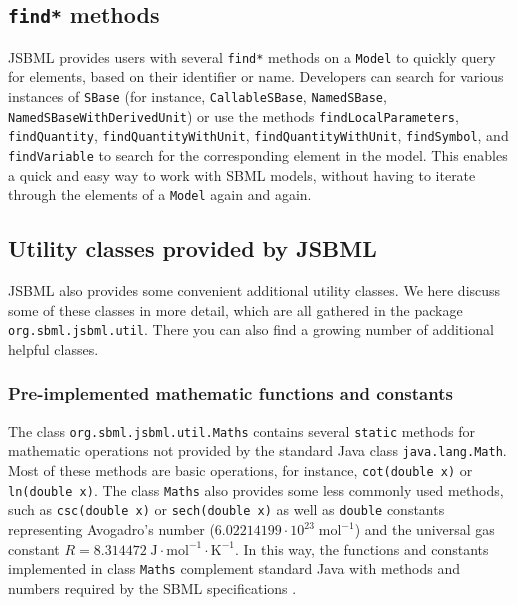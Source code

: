 \subsection{\texttt{find*} methods}

JSBML provides users with several \texttt{find*} methods
%
on a \texttt{Model}
%
to quickly query for elements, based on their identifier or name. Developers can
search for various instances of \texttt{SBase} (for instance,
\texttt{CallableSBase},
%
\texttt{NamedSBase},
%
\texttt{NamedSBaseWithDerivedUnit})
%
or use the methods \texttt{findLocalParameters}, \texttt{findQuantity},
\texttt{findQuantityWithUnit}, \texttt{findQuantityWithUnit},
\texttt{findSymbol}, and \texttt{findVariable} to search for the corresponding
element in the model. This enables a quick and easy way to work with SBML
models, without having to iterate through the elements of a \texttt{Model} again
and again.

\subsection{Utility classes provided by JSBML}

JSBML also provides some convenient additional utility classes. We here discuss
some of these classes in more detail, which are all gathered in
the package \texttt{org.sbml.jsbml.util}. There you can also find a growing
number of additional helpful classes.


\subsubsection{Pre-implemented mathematic functions and constants}

The class \texttt{org.sbml.jsbml.util.Maths}
%
contains several \texttt{static} methods for mathematic operations not provided
by the standard Java class \texttt{java.lang.Math}. Most of these methods are
basic operations, for instance, \texttt{cot(double x)} or \texttt{ln(double x)}.
The class \texttt{Maths} also provides some less commonly used methods,
such as \texttt{csc(double x)} or \texttt{sech(double x)} as well as
\texttt{double} constants representing Avogadro's number ($6.02214199 \cdot
10^{23}\;\mathrm{mol}^{-1}$) and the universal gas constant
$R = 8.314472\;\mathrm{J}\cdot\mathrm{mol}^{-1}\cdot\mathrm{K}^{-1}$. In this
way, the functions and constants implemented in class \texttt{Maths} complement
standard Java with methods and numbers required by the SBML specifications
\citep{Hucka2003, Hucka2008, Hucka2010a}.

